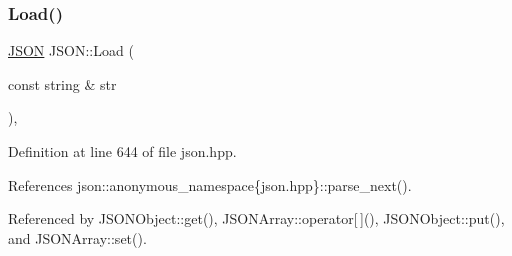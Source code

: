 \subsubsection{\texorpdfstring{Load()}{Load()}}
{\footnotesize\ttfamily \mbox{\hyperlink{classjson_1_1_j_s_o_n}{J\+S\+ON}} J\+S\+O\+N\+::\+Load (\begin{DoxyParamCaption}\item[{const string \&}]{str }\end{DoxyParamCaption})\hspace{0.3cm}{\ttfamily [inline]}, {\ttfamily [static]}}



Definition at line 644 of file json.\+hpp.



References json\+::anonymous\+\_\+namespace\{json.\+hpp\}\+::parse\+\_\+next().



Referenced by J\+S\+O\+N\+Object\+::get(), J\+S\+O\+N\+Array\+::operator\mbox{[}$\,$\mbox{]}(), J\+S\+O\+N\+Object\+::put(), and J\+S\+O\+N\+Array\+::set().


